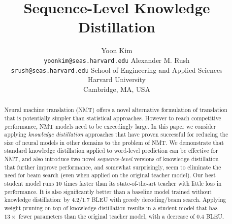 \documentclass[11pt,letterpaper]{article}
\title{Sequence-Level Knowledge Distillation}
\author{Yoon Kim \\ {\tt yoonkim@seas.harvard.edu} 
\And 
Alexander M. Rush \\ {\tt srush@seas.harvard.edu} 
\AND 
\textnormal{School of Engineering and Applied Sciences} \\
\textnormal{Harvard University} \\
Cambridge, MA, USA  \\
}
\date{}
\begin{document}
\maketitle



\newcommand{\fix}{\marginpar{FIX}}
\newcommand{\new}{\marginpar{NEW}}
\newcommand{\xvec}{\mathbf{x}}
\newcommand{\yvec}{\mathbf{y}}
\newcommand{\cvec}{\mathbf{c}}
\newcommand{\zvec}{\mathbf{z}}
\newcommand{\svec}{\mathbf{s}}
\newcommand{\tvec}{\mathbf{t}}
\newcommand{\mcL}{\mathcal{L}}
\newcommand{\mcT}{\mathcal{T}}
\newcommand{\mcY}{\mathcal{Y}}
\newcommand{\mcV}{\mathcal{V}}
\newcommand{\mcC}{\mathcal{C}}
\newcommand{\mcA}{\mathcal{A}}
\newcommand{\context}{\mathbf{y}_{\mathrm{c}}}
\newcommand{\embcontext}{\mathbf{\tilde{y}}_{\mathrm{c}}}
\newcommand{\inpcontext}{\mathbf{\tilde{x}}}
\newcommand{\start}{\mathbf{\tilde{y}}_{\mathrm{c0}}}
\newcommand{\End}{\mathrm{\texttt{</s>}}}

\newcommand{\Uvec}{\mathbf{U}}
\newcommand{\Evec}{\mathbf{E}}
\newcommand{\Gvec}{\mathbf{G}}
\newcommand{\Fvec}{\mathbf{F}}
\newcommand{\Pvec}{\mathbf{P}}
\newcommand{\pvec}{\mathbf{p}}
\newcommand{\Vvec}{\mathbf{V}}
\newcommand{\Wvec}{\mathbf{W}}
\newcommand{\hvec}{\mathbf{h}}
\newcommand{\wvec}{\mathbf{w}}
\newcommand{\uvec}{\mathbf{u}}
\newcommand{\vvec}{\mathbf{v}}
\newcommand{\bvec}{\mathbf{b}}
\newcommand{\reals}{\mathbb{R}}
\newcommand\given{\,|\,}


\maketitle

\begin{abstract} 
  Neural machine translation (NMT) offers a novel alternative
  formulation of translation that is potentially simpler than
  statistical approaches. However to reach competitive performance,
  NMT models need to be exceedingly large.
  In this paper we consider
  applying \textit{knowledge distillation} approaches 
  \cite{Bucila2006,Hinton2015} that have proven
  successful for reducing the size of neural models in other domains
  to the problem of NMT. We demonstrate that standard knowledge
  distillation applied to word-level prediction can be effective for
  NMT, and also introduce two novel \textit{sequence-level} versions
  of knowledge distillation that further improve performance, and
  somewhat surprisingly, seem to eliminate the need for beam search (even when
  applied on the original teacher model). Our best
  student model runs $10$ times faster than its state-of-the-art teacher with
  little loss in performance. 
  It is also significantly better than a baseline model trained without
   knowledge distillation: by $4.2/1.7$ BLEU with greedy decoding/beam search. 
   Applying weight pruning on top of knowledge distillation results in a student model
   that has $13 \times$ fewer parameters than the original teacher model,
   with a decrease of $0.4$ BLEU.
\end{abstract}
\end{document}
